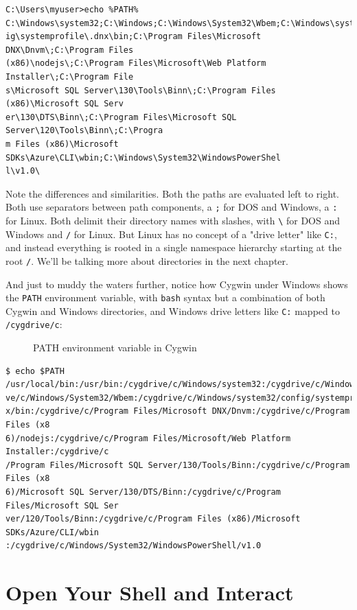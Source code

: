 \documentclass[10pt,]{book}
\numberwithin{figure}{chapter}
\DeclareRobustCommand{\drcap}[1]{\begin{figure}[H]\caption{#1}\end{figure}}
\DeclareRobustCommand{\drshl}[1]{\index{Shells!#1}}
\begin{document}
\begin{verbatim}
C:\Users\myuser>echo %PATH%
C:\Windows\system32;C:\Windows;C:\Windows\System32\Wbem;C:\Windows\system32\conf
ig\systemprofile\.dnx\bin;C:\Program Files\Microsoft DNX\Dnvm\;C:\Program Files
(x86)\nodejs\;C:\Program Files\Microsoft\Web Platform Installer\;C:\Program File
s\Microsoft SQL Server\130\Tools\Binn\;C:\Program Files (x86)\Microsoft SQL Serv
er\130\DTS\Binn\;C:\Program Files\Microsoft SQL Server\120\Tools\Binn\;C:\Progra
m Files (x86)\Microsoft SDKs\Azure\CLI\wbin;C:\Windows\System32\WindowsPowerShel
l\v1.0\
\end{verbatim}

Note the differences and similarities. Both the paths are evaluated left
to right. Both use separators between path components, a \texttt{;} for
DOS and Windows, a \texttt{:} for Linux. Both delimit their directory
names with slashes, with \texttt{\textbackslash{}} for DOS and Windows
and \texttt{/} for Linux. But Linux has no concept of a "drive letter"
like \texttt{C:}, and instead everything is rooted in a single namespace
hierarchy starting at the root \texttt{/}. We'll be talking more about
directories in the next chapter.

And just to muddy the waters further, notice how Cygwin\drshl{Cygwin}
under Windows shows the \texttt{PATH} environment variable, with
\texttt{bash} syntax but a combination of both Cygwin and Windows
directories, and Windows drive letters like \texttt{C:} mapped to
\texttt{/cygdrive/c}:

\drcap{PATH environment variable in Cygwin}

\begin{verbatim}
$ echo $PATH
/usr/local/bin:/usr/bin:/cygdrive/c/Windows/system32:/cygdrive/c/Windows:/cygdri
ve/c/Windows/System32/Wbem:/cygdrive/c/Windows/system32/config/systemprofile/.dn
x/bin:/cygdrive/c/Program Files/Microsoft DNX/Dnvm:/cygdrive/c/Program Files (x8
6)/nodejs:/cygdrive/c/Program Files/Microsoft/Web Platform Installer:/cygdrive/c
/Program Files/Microsoft SQL Server/130/Tools/Binn:/cygdrive/c/Program Files (x8
6)/Microsoft SQL Server/130/DTS/Binn:/cygdrive/c/Program Files/Microsoft SQL Ser
ver/120/Tools/Binn:/cygdrive/c/Program Files (x86)/Microsoft SDKs/Azure/CLI/wbin
:/cygdrive/c/Windows/System32/WindowsPowerShell/v1.0
\end{verbatim}

\section*{Open Your Shell and
Interact}\label{open-your-shell-and-interact}
\end{document}
